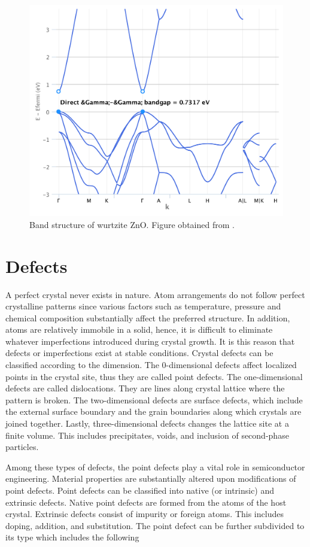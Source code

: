 \begin{figure}[tbh!] 
	\centering
	\includegraphics[width=0.48\linewidth]{"images/rrl/bands"}
	\caption[Band structure of wurtzite ZnO]{Band structure of wurtzite ZnO. Figure obtained from \citep{Ong2015}.}
	\label{fig:bands_rrl}
\end{figure}


\section{Defects}
A perfect crystal never exists in nature. Atom arrangements do not follow perfect crystalline patterns since various factors such as temperature, pressure and chemical composition substantially affect the preferred structure. In addition, atoms are relatively immobile in a solid, hence, it is difficult to eliminate whatever imperfections introduced during crystal growth. It is this reason that defects or imperfections exist at stable conditions.  Crystal defects can be classified according to the dimension. The 0-dimensional defects affect localized points in the crystal site, thus they are called point defects. The one-dimensional defects are called dislocations. They are lines along  crystal lattice where the pattern is broken. The two-dimensional defects are surface defects, which include the external surface boundary and the grain boundaries along which crystals are joined together. Lastly, three-dimensional defects changes the lattice site at a finite volume. This includes precipitates, voids, and inclusion of second-phase particles. 

Among these types of defects, the point defects play a vital role in semiconductor engineering. Material properties are substantially altered upon modifications of point defects. Point defects can be classified into native (or intrinsic) and extrinsic defects. Native point defects are formed from the atoms of the host crystal. Extrinsic defects consist of impurity or foreign atoms. This includes doping, addition, and substitution. The point defect can be further subdivided to its type which includes the following  

